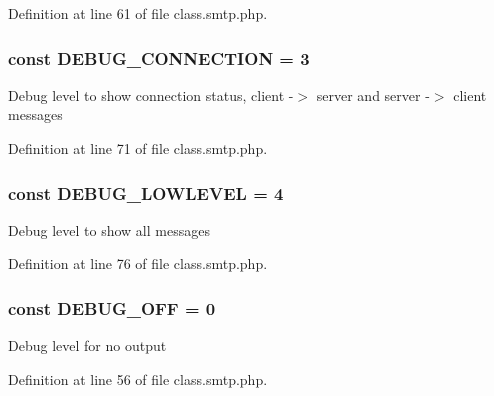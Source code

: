 Definition at line 61 of file class.\+smtp.\+php.

\subsubsection[{\texorpdfstring{D\+E\+B\+U\+G\+\_\+\+C\+O\+N\+N\+E\+C\+T\+I\+ON}{DEBUG_CONNECTION}}]{\setlength{\rightskip}{0pt plus 5cm}const D\+E\+B\+U\+G\+\_\+\+C\+O\+N\+N\+E\+C\+T\+I\+ON = 3}\hypertarget{class_s_m_t_p_a9a8bb8dbeb4eb52455545a52bbe35fa6}{}\label{class_s_m_t_p_a9a8bb8dbeb4eb52455545a52bbe35fa6}
Debug level to show connection status, client -\/$>$ server and server -\/$>$ client messages 

Definition at line 71 of file class.\+smtp.\+php.

\subsubsection[{\texorpdfstring{D\+E\+B\+U\+G\+\_\+\+L\+O\+W\+L\+E\+V\+EL}{DEBUG_LOWLEVEL}}]{\setlength{\rightskip}{0pt plus 5cm}const D\+E\+B\+U\+G\+\_\+\+L\+O\+W\+L\+E\+V\+EL = 4}\hypertarget{class_s_m_t_p_a9a6a605b541c69171fd68f103e947458}{}\label{class_s_m_t_p_a9a6a605b541c69171fd68f103e947458}
Debug level to show all messages 

Definition at line 76 of file class.\+smtp.\+php.

\subsubsection[{\texorpdfstring{D\+E\+B\+U\+G\+\_\+\+O\+FF}{DEBUG_OFF}}]{\setlength{\rightskip}{0pt plus 5cm}const D\+E\+B\+U\+G\+\_\+\+O\+FF = 0}\hypertarget{class_s_m_t_p_ad36a2f0b30093f91a7b53bd815a0a143}{}\label{class_s_m_t_p_ad36a2f0b30093f91a7b53bd815a0a143}
Debug level for no output 

Definition at line 56 of file class.\+smtp.\+php.

